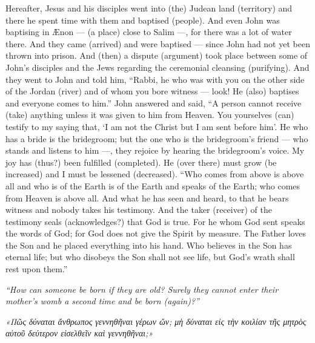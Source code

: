 \begin{pages}
\begin{Leftside}
		\pend
		\pstart
		Hereafter, Jesus and his disciples went into (the) Judean land (territory) and there he spent time with them and baptised (people). And even John was baptising in Ænon — (a place) close to Salim —, for there was a lot of water there. And they came (arrived) and were baptised — since John had not yet been thrown into prison. 
		\pend
		\pstart
		And (then) a dispute (argument) took place between some of John’s disciples and the Jews regarding the ceremonial cleansing (purifying). And they went to John and told him, “Rabbi, he who was with you on the other side of the Jordan (river) and of whom you bore witness — look! He (also) baptises and everyone comes to him.” John answered and said, “A person cannot receive (take) anything unless it was given to him from Heaven. You yourselves (can) testify to my saying that, ‘I am not the Christ but I am sent before him’. He who has a bride is the bridegroom; but the one who is the bridegroom’s friend — who stands and listens to him —, they rejoice by hearing the bridegroom’s voice. My joy has (thus?) been fulfilled (completed). He (over there) must grow (be increased) and I must be lessened (decreased).
		\pend
		\pstart
		“Who comes from above is above all and who is of the Earth is of the Earth and speaks of the Earth; who comes from Heaven is above all. And what he has seen and heard, to that he bears witness and nobody takes his testimony. And the taker (receiver) of the testimony seals (acknowledges?) that God is true. For he whom God sent speaks the words of God; for God does not give the Spirit by measure. The Father loves the Son and he placed everything into his hand. Who believes in the Son has eternal life; but who disobeys the Son shall not see life, but God’s wrath shall rest upon them.” 
		\pend
        \endnumbering
    \end{Leftside}
\end{pages} 
\Pages

\clearpage
\thispagestyle{empty}
\null\vfill
\settowidth{}
\begin{center}
\parbox{\longest}{%
  \raggedright{\huge\itshape%
    ``How can someone be born if they are old? Surely they cannot enter their mother’s womb a second time and be born (again)?'' \par\bigskip
  }
}
\vfill\vfill
\clearpage\newpage
\end{center}
\newpage
\thispagestyle{empty}
\null\vfill
\settowidth{}
\begin{center}
\parbox{\longest}{%
  \raggedright{\huge\itshape%
    «Πῶς δύναται ἄνθρωπος γεννηθῆναι γέρων ὤν; μὴ δύναται εἰς τὴν κοιλίαν τῆς μητρὸς αὐτοῦ δεύτερον εἰσελθεῖν καὶ γεννηθῆναι;» \par\bigskip
  }
}
\end{center}
\vfill\vfill